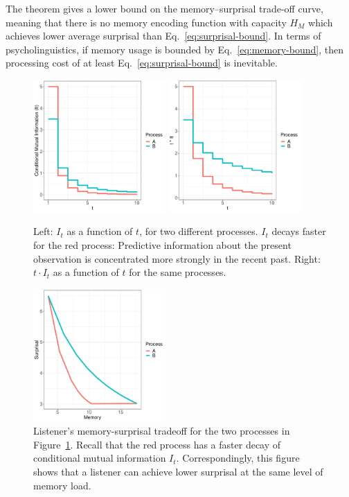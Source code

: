 The theorem gives a lower bound on the memory--surprisal trade-off curve, meaning that there is no memory encoding function with capacity $H_M$ which achieves lower average surprisal than Eq.~\ref{eq:surprisal-bound}. In terms of psycholinguistics, if memory usage is bounded by Eq.~\ref{eq:memory-bound}, then processing cost of at least Eq.~\ref{eq:surprisal-bound} is inevitable.

\begin{figure}
\includegraphics[width=0.45\textwidth]{figures/decay.pdf}
\includegraphics[width=0.45\textwidth]{figures/memory.pdf}
%
	\caption{Left: $I_t$ as a function of $t$, for two different processes. $I_t$ decays faster for the red process: Predictive information about the present observation is concentrated more strongly in the recent past. Right: $t \cdot I_t$ as a function of $t$ for the same processes. }\label{fig:basic}
\end{figure}

\begin{figure}
\includegraphics[width=0.45\textwidth]{figures/listener-tradeoff.pdf}
	\caption{Listener's memory-surprisal tradeoff for the two processes in Figure~\ref{fig:basic}. Recall that the red process has a faster decay of conditional mutual information $I_t$. Correspondingly, this figure shows that a listener can achieve lower surprisal at the same level of memory load. }\label{fig:listener-tradeoff}
\end{figure}

